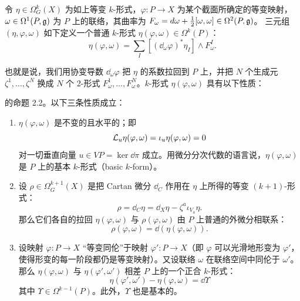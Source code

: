 
\begin{definition}
令 $\eta\in\Omega^k_G(X)$ 为如上等变 $k$-形式，$\varphi: P\to X$ 为某个截面所确定的等变映射，$\omega\in\Omega^1(P,\mathfrak{g})$ 为 $P$ 上的联络，其曲率为 $F_\omega = d\omega+\tfrac{1}{2}[\omega,\omega]\in\Omega^2(P,\mathfrak{g})$。
三元组 $(\eta,\varphi,\omega)$ 如下定义一个普通 $k$-形式 $\eta(\varphi,\omega)\in\Omega^k(P)$：
\[
    \eta(\varphi,\omega) = \sum_I \left[(\dd_\omega\varphi)^*\eta_I\right]\wedge F^I_\omega .
\]
\end{definition}

也就是说，我们用协变导数 $\dd_\omega\varphi$ 把 $\eta$ 的系数拉回到 $P$ 上，并把 $N$ 个生成元 $\zeta^1,\dots,\zeta^N$ 换成 $N$ 个 2-形式 $F^1_\omega,\dots,F^N_\omega$。$k$-形式 $\eta(\varphi,\omega)$ 具有以下性质：


\begin{theorem}
[18] 的命题 2.2。以下三条性质成立：
\begin{enumerate}
\item $\eta(\varphi,\omega)$ 是不变的且水平的；即
\[ \mathcal{L}_u\eta(\varphi,\omega) = \iota_u\eta(\varphi,\omega) = 0 \]
对一切垂直向量 $u\in VP=\ker\dd\pi$ 成立。用微分分次代数的语言说，$\eta(\varphi,\omega)$ 是 $P$ 上的基本 $k$-形式（basic $k$-form）。
\item 设 $\rho\in\Omega^{k+1}_G(X)$ 是把 Cartan 微分 $\dd_C$ 作用在 $\eta$ 上所得的等变 $(k+1)$-形式：
\[ \rho = \dd_C\eta = \dd_X\eta - \zeta^a\iota_{V_a}\eta . \]
那么它们各自的拉回 $\eta(\varphi,\omega)$ 与 $\rho(\varphi,\omega)$ 由 $P$ 上普通的外微分相联系：
\[ \rho(\varphi,\omega) = \dd\left(\eta(\varphi,\omega)\right). \]
\item 设映射 $\varphi: P\to X$ “等变同伦”于映射 $\varphi': P\to X$（即 $\varphi$ 可以光滑地形变为 $\varphi'$，使得形变的每一阶段都仍是等变映射）。又设联络 $\omega$ 在联络空间中同伦于 $\omega'$。那么 $\eta(\varphi,\omega)$ 与 $\eta(\varphi',\omega')$ 相差 $P$ 上的一个正合 $k$-形式：
\[ \eta(\varphi',\omega') - \eta(\varphi,\omega) = \dd\Upsilon \]
其中 $\Upsilon\in\Omega^{k-1}(P)$。此外，$\Upsilon$ 也是基本的。
\end{enumerate}
\end{theorem}

